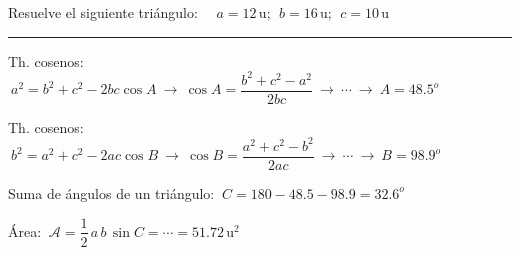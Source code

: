 \begin{miejercicio}

Resuelve el siguiente triángulo: $\quad a=12\, \mathrm{u};\ \ b=16\, \mathrm{u} ;\ \ c=10\, \mathrm{u}$

\rule{250pt}{0.1pt}

\vspace{2mm} Th. cosenos: $\ a^2=b^2+c^2-2bc\cos A\ \to \ \cos A=\dfrac{b^2+c^2-a^2}{2bc} \  \to \ \cdots \ \to \ A=48.5^o$  

\vspace{2mm} Th. cosenos: $\ b^2=a^2+c^2-2ac\cos B\ \to \ \cos B=\dfrac{a^2+c^2-b^2}{2ac} \  \to \ \cdots \ \to \ B=98.9^o$

\vspace{2mm} Suma de ángulos de un triángulo: $\ C=180-48.5- 98.9=32.6^o$

\vspace{2mm} Área: $\ \mathcal A=\dfrac 1 2 \, a	\, b\, \sin C =\cdots = 51.72\, \mathrm{u}^2$
	
\end{miejercicio}




